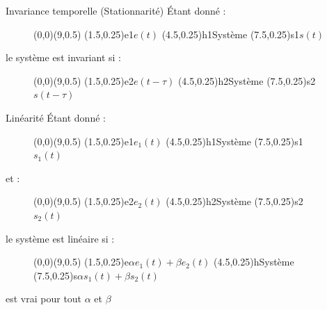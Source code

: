 \documentclass[a4paper,11pt]{beamer}
\begin{document}
\begin{frame}
\begin{block}{Invariance temporelle (Stationnarité)}
Étant donné :
\begin{figure}
	\begin{pspicture}[showgrid=false](0,0)(9,0.5)
		\pssignal(1.5,0.25){e1}{$e(t)$}
		\psfblock[framesize=1.75 0.65](4.5,0.25){h1}{Système}
		\pssignal(7.5,0.25){s1}{$s(t)$}
	\end{pspicture}
\end{figure}
le système est invariant si : 
\begin{figure}
	\begin{pspicture}[showgrid=false](0,0)(9,0.5)
		\pssignal(1.5,0.25){e2}{$e(t - \tau)$}
		\psfblock[framesize=1.75 0.65](4.5,0.25){h2}{Système}
		\pssignal(7.5,0.25){s2}{$s(t - \tau)$}
	\end{pspicture}
\end{figure}
\end{block}
\end{frame}

\begin{frame}
\begin{block}{Linéarité}
Étant donné :
\begin{figure}
	\begin{pspicture}[showgrid=false](0,0)(9,0.5)
		\pssignal(1.5,0.25){e1}{$e_{1}(t)$}
		\psfblock[framesize=1.75 0.65](4.5,0.25){h1}{Système}
		\pssignal(7.5,0.25){s1}{$s_{1}(t)$}
	\end{pspicture}
\end{figure}
et : 
\begin{figure}
	\begin{pspicture}[showgrid=false](0,0)(9,0.5)
		\pssignal(1.5,0.25){e2}{$e_{2}(t)$}
		\psfblock[framesize=1.75 0.65](4.5,0.25){h2}{Système}
		\pssignal(7.5,0.25){s2}{$s_{2}(t)$}
	\end{pspicture}
\end{figure}
le système est linéaire si :
\begin{figure}
	\begin{pspicture}[showgrid=false](0,0)(9,0.5)
		\pssignal(1.5,0.25){e}{$\alpha e_{1}(t) + \beta e_{2}(t)$}
		\psfblock[framesize=1.75 0.65](4.5,0.25){h}{Système}
		\pssignal(7.5,0.25){s}{$\alpha s_{1}(t) + \beta s_{2}(t)$}
	\end{pspicture}
\end{figure}
est vrai pour tout $\alpha$ et $\beta$
\end{block}
\end{frame}
\end{document}
